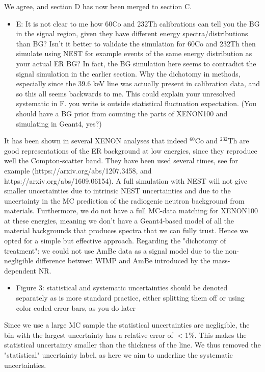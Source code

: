 \documentclass{article}
\begin{document}
We agree, and section D has now been merged to section C.



\begin{itemize}
	\item {\color{blue} 
E: It is not clear to me how 60Co and 232Th calibrations can tell you
the BG in the signal region, given they have different energy
spectra/distributions than BG? Isn’t it better to validate the
simulation for 60Co and 232Th then simulate using NEST for example
events of the same energy distribution as your actual ER BG? In fact,
the BG simulation here seems to contradict the signal simulation in
the earlier section. Why the dichotomy in methods, especially since
the 39.6 keV line was actually present in calibration data, and so
this all seems backwards to me. This could explain your unresolved
systematic in F. you write is outside statistical fluctuation
expectation. (You should have a BG prior from counting the parts of
XENON100 and simulating in Geant4, yes?)}
\end{itemize}


It has been shown in several XENON analyses that indeed $^{60}$Co and $^{232}$Th are good
representations of the ER background at low energies, since they reproduce well the Compton-scatter band. They have been used several  times, 
see for example (https://arxiv.org/abs/1207.3458, and https://arxiv.org/abs/1609.06154).
A full simulation with NEST will not give smaller uncertainties due to intrinsic
NEST uncertainties and due to the  uncertainty in the MC prediction of the radiogenic neutron background from materials.
Furthermore, we do not have a full MC-data matching for XENON100 at these energies, 
meaning we don't have a Geant4-based model of all the material 
backgrounds that produces spectra that we can fully trust. Hence we opted for a simple 
but effective approach. 
Regarding the "dichotomy of treatment": we could not use AmBe data as a signal model due to 
the non-negligible difference between WIMP and AmBe introduced by the mass-dependent NR.


\begin{itemize}
	\item {\color{blue} 
Figure 3: statistical and systematic uncertainties should be denoted
separately as is more standard practice, either splitting them off or
using color coded error bars, as you do later}
\end{itemize}

Since we use a large MC sample the statistical uncertainties are negligible, the bin with the largest uncertainty 
has  a relative error of $<$1\%. This makes the statistical uncertainty smaller than the thickness of the line.
We thus removed the "statistical" uncertainty label, as here we aim to underline the systematic uncertainties.
\end{document}

